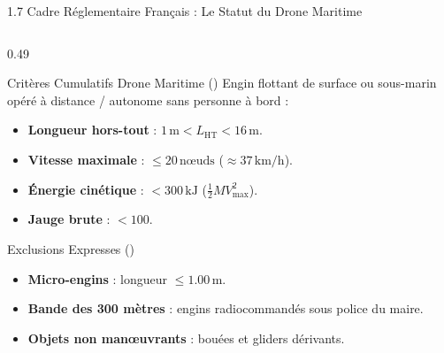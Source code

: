 \begin{frame}{1.7 Cadre Réglementaire Français : Le Statut du Drone Maritime}
\begin{columns}[T]
    \begin{column}{0.49\textwidth}
      \begin{alertblock}{Critères Cumulatifs Drone Maritime ()}
        \scriptsize
        Engin flottant de surface ou sous-marin opéré à distance / autonome sans personne à bord :
        \begin{itemize}\scriptsize
          \item \textbf{Longueur hors-tout} : $1\,\text{m} < L_{\text{HT}} < 16\,\text{m}$.
          \item \textbf{Vitesse maximale} : $\le 20\,\text{n\oe uds}$ ($\approx 37\,\text{km/h}$).
          \item \textbf{Énergie cinétique} : $< 300\,\text{kJ}$ ($\frac{1}{2} M V_{\max}^2$).
          \item \textbf{Jauge brute} : $< 100$.
        \end{itemize}
      \end{alertblock}

      \vspace{-0.3em}
      \begin{exampleblock}{Exclusions Expresses ()}
        \scriptsize
        \begin{itemize}\scriptsize
          \item \textbf{Micro-engins} : longueur $\le 1.00\,\text{m}$.
          \item \textbf{Bande des 300 mètres} : engins radiocommandés sous police du maire.
          \item \textbf{Objets non man{\oe}uvrants} : bouées et gliders dérivants.
        \end{itemize}
      \end{exampleblock}
    \end{column}
  \end{columns}
\end{frame}

